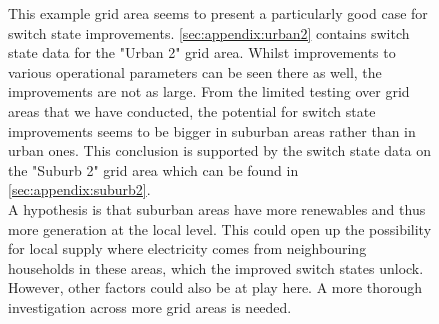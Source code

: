 \begin{figure}[H]
This example grid area seems to present a particularly good case
for switch state improvements. \autoref{sec:appendix:urban2} contains
switch state data for the "Urban 2" grid area. Whilst improvements
to various operational parameters can be seen there as well, the improvements
are not as large. From the limited testing over grid areas that we 
have conducted, the potential for switch state improvements seems to be
bigger in suburban areas rather than in urban ones. This conclusion is
supported by the switch state data on the "Suburb 2" grid area
which can be found in \autoref{sec:appendix:suburb2}.\\
A hypothesis is that suburban areas have more renewables and thus more
generation at the local level. This could open up the possibility
for local supply where electricity comes from neighbouring households in
these areas, which the improved switch states unlock.\\
However, other factors could also be at play here. A more thorough investigation
across more grid areas is needed.

\end{figure}
